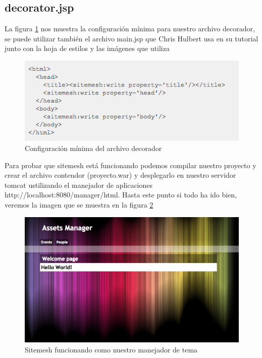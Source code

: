 \documentclass[12pt,a4paper]{article}
\begin{document}
        \subsection{decorator.jsp}
        La figura \ref{09_decorator_jsp} nos muestra la configuraci\'on m\'inima para nuestro archivo decorador, se puede utilizar tambi\'en el archivo main.jsp que Chris Hulbert usa en su tutorial junto con la hoja de estilos y las im\'agenes que utiliza
        \begin{figure}[h]
            \centering
            \includegraphics[scale=0.7]{09_decorator_jsp}
            \caption{Configuraci\'on m\'inima del archivo decorador}
            \label{09_decorator_jsp}
        \end{figure}
        
        Para probar que sitemesh est\'a funcionando podemos compilar nuestro proyecto y crear el archivo contendor (proyecto.war) y desplegarlo en nuestro servidor tomcat ustilizando el manejador de aplicaciones http://localhost:8080/manager/html. Hasta este punto si todo ha ido bien, veremos la imagen que se muestra en la figura \ref{10_tomcat_sitemesh}
        \begin{figure}[h]
            \centering
            \includegraphics[scale=0.4]{10_tomcat_sitemesh}
            \caption{Sitemesh funcionando como nuestro manejador de tema}
            \label{10_tomcat_sitemesh}
        \end{figure}
		\newpage
\end{document}
